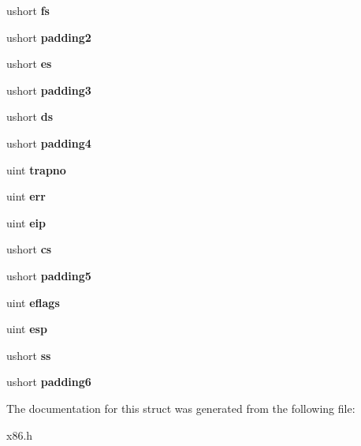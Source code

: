 \begin{DoxyCompactItemize}
ushort {\bfseries fs}
\item 
\mbox{\label{structtrapframe_a63737765c58491a8604ef180a3864ad0}} 
ushort {\bfseries padding2}
\item 
\mbox{\label{structtrapframe_ab974b358098da0aaa5897c32827a038d}} 
ushort {\bfseries es}
\item 
\mbox{\label{structtrapframe_acd8a8fee013b35212fab787b645f8dd9}} 
ushort {\bfseries padding3}
\item 
\mbox{\label{structtrapframe_a421be1ec9ad2a55f1d1adeac9b0b89c3}} 
ushort {\bfseries ds}
\item 
\mbox{\label{structtrapframe_aef4bc72b31fb4a0cf6b32782b40a7e2f}} 
ushort {\bfseries padding4}
\item 
\mbox{\label{structtrapframe_abc7f81b0a6a91d13e9fefe171b0a7d12}} 
uint {\bfseries trapno}
\item 
\mbox{\label{structtrapframe_acfb2346e6184b0d2438960b4f2a67e4f}} 
uint {\bfseries err}
\item 
\mbox{\label{structtrapframe_a886a5973a537894e3a95435f38767d5c}} 
uint {\bfseries eip}
\item 
\mbox{\label{structtrapframe_a61261f63223a73e25be79fcc8c625265}} 
ushort {\bfseries cs}
\item 
\mbox{\label{structtrapframe_a5715f786df145b0bf6faf3aa3304f05f}} 
ushort {\bfseries padding5}
\item 
\mbox{\label{structtrapframe_ae6b3005ad34416546603ab18dbb4a644}} 
uint {\bfseries eflags}
\item 
\mbox{\label{structtrapframe_acd319e2dbd720d217c10f8fb620d73e2}} 
uint {\bfseries esp}
\item 
\mbox{\label{structtrapframe_aa9c9b52b242d4f42fe4252e26b655bf6}} 
ushort {\bfseries ss}
\item 
\mbox{\label{structtrapframe_a1c079b271df9fdd3502bfe9e00888dfa}} 
ushort {\bfseries padding6}
\end{DoxyCompactItemize}


The documentation for this struct was generated from the following file\+:\begin{DoxyCompactItemize}
\item 
x86.\+h\end{DoxyCompactItemize}
